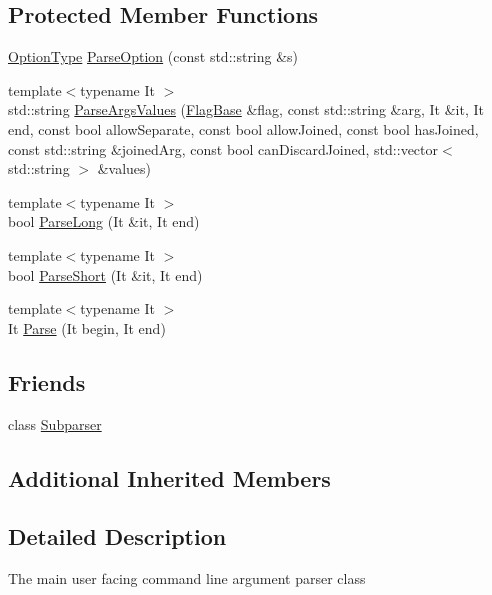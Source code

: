 \subsection*{Protected Member Functions}
\begin{DoxyCompactItemize}
\item 
\hyperlink{classargs_1_1_argument_parser_af01ec624f521beee7a1ac7ff589a3788}{Option\+Type} \hyperlink{classargs_1_1_argument_parser_a68c6996f0b974924feb1294eb976edf1}{Parse\+Option} (const std\+::string \&s)
\item 
{\footnotesize template$<$typename It $>$ }\\std\+::string \hyperlink{classargs_1_1_argument_parser_ae8ff941317a3df4360c0c8d91f2823bd}{Parse\+Args\+Values} (\hyperlink{classargs_1_1_flag_base}{Flag\+Base} \&flag, const std\+::string \&arg, It \&it, It end, const bool allow\+Separate, const bool allow\+Joined, const bool has\+Joined, const std\+::string \&joined\+Arg, const bool can\+Discard\+Joined, std\+::vector$<$ std\+::string $>$ \&values)
\item 
{\footnotesize template$<$typename It $>$ }\\bool \hyperlink{classargs_1_1_argument_parser_a3143420b4177ce05c076700308d427c2}{Parse\+Long} (It \&it, It end)
\item 
{\footnotesize template$<$typename It $>$ }\\bool \hyperlink{classargs_1_1_argument_parser_a7c975868c3cdcd14465dad5cbaab07b1}{Parse\+Short} (It \&it, It end)
\item 
{\footnotesize template$<$typename It $>$ }\\It \hyperlink{classargs_1_1_argument_parser_a0de11619cf36f34f2e02b787cb92afa6}{Parse} (It begin, It end)
\end{DoxyCompactItemize}
\subsection*{Friends}
\begin{DoxyCompactItemize}
\item 
class \hyperlink{classargs_1_1_argument_parser_aecbd7c0572cb2d7fecb5eff79552c203}{Subparser}
\end{DoxyCompactItemize}
\subsection*{Additional Inherited Members}


\subsection{Detailed Description}
The main user facing command line argument parser class 

